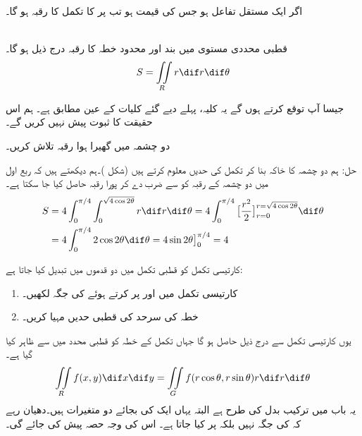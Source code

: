 اگر  ایک مستقل تفاعل ہو جس کی قیمت  ہو  تب  پر  کا تکمل  کا رقبہ ہو گا۔

\\
قطبی محددی مستوی میں بند اور محدود خطہ  کا  رقبہ درج ذیل ہو گا۔
\begin{align}
S=\iint\limits_R r\dif r\dif\theta
\end{align}

جیسا آپ توقع کرتے ہوں گے یہ کلیہ، پہلے دیے گئے کلیات کے عین مطابق ہے۔ ہم اس حقیقت کا ثبوت پیش نہیں کریں گے۔

دو  چشمہ  میں گھیرا ہوا  رقبہ تلاش کریں۔

حل:\quad
ہم دو چشمہ کا خاکہ بنا کر تکمل کی حدیں معلوم کرتے ہیں (شکل )۔ہم دیکھتے ہیں کہ ربع اول میں دو چشمہ کے رقبہ کو  سے ضرب دے کر پورا رقبہ حاصل کیا جا سکتا ہے۔
\begin{align*}
S&=4\int_{0}^{\pi/4}\int_0^{\sqrt{4\cos2\theta}}r\dif r\dif \theta=4\int_0^{\pi/4}\big[\frac{r^2}{2}\big]_{r=0}^{r=\sqrt{4\cos2\theta}}\dif\theta\\
&=4\int_0^{\pi/4}2\cos2\theta\dif\theta=4\sin2\theta\big]_0^{\pi/4}=4
\end{align*}

کارتیسی تکمل  کو قطبی تکمل میں  دو قدموں میں تبدیل کیا جاتا ہے:
\begin{enumerate}[1.]
\item
کارتیسی تکمل میں   اور  پر کرتے ہوئے   کی جگہ  لکھیں۔
\item
خطہ  کی سرحد کی قطبی حدیں مہیا کریں۔
\end{enumerate}
 
یوں کارتیسی تکمل سے درج ذیل حاصل ہو گا جہاں تکمل کے خطہ کو قطبی محدد میں  سے ظاہر کیا گیا ہے۔
\begin{align}\label{مساوات_بالکثرت_قطبی_محدد_میں_رقبہ_کی_عمومی}
\iint\limits_R f(x,y)\dif x\dif y=\iint\limits_G f(r\cos\theta,r\sin\theta)r\dif r\dif \theta
\end{align}
یہ  باب  میں ترکیب بدل کی طرح ہے البتہ یہاں ایک کی بجائے دو متغیرات ہیں۔دھیان رہے کہ  کی جگہ  نہیں بلکہ  پر کیا جاتا ہے۔ اس کی وجہ حصہ   پیش کی جائے گی۔

